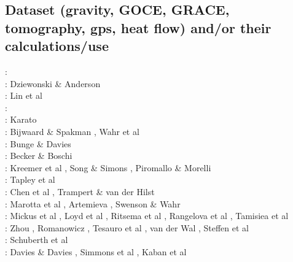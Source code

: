 \subsection{Dataset (gravity, GOCE, GRACE, tomography, gps, heat flow) 
and/or their calculations/use}

\begin{scriptsize}
\nineteenseventyseven: \cite{rola77}\\
\nineteeneightyone: Dziewonski \& Anderson \cite{dzan81}\\
\nineteenninety: Lin et al \cite{lips90}\\
\nineteenninetyone: \cite{spak91}\\
\nineteenninetythree: Karato \cite{kara93}\\
\nineteenninetyeight: Bijwaard \& Spakman \cite{bisp98}, Wahr et al \cite{wamb98}\\
\twothousandone: Bunge \& Davies \cite{buda01}\\
\twothousandtwo: Becker \& Boschi \cite{bebo02}\\
\twothousandthree: Kreemer et al \cite{krhh03}, Song \& Simons \cite{sosi03}, 
Piromallo \& Morelli \cite{pimo03}\\
\twothousandfour: Tapley et al \cite{tabr04}\\
\twothousandfive: Chen et al \cite{chrw05}, Trampert \& van der Hilst \cite{trva05}\\
\twothousandsix: Marotta et al \cite{masr06}, Artemieva \cite{arte06}, Swenson \& Wahr \cite{swwa06}\\
\twothousandseven: Mickus et al \cite{mitk07}, Loyd et al \cite{lobc07}, Ritsema et al \cite{rimb07}, 
Rangelova et al \cite{ravb07}, Tamisiea et al \cite{tamd07}\\
\twothousandeight: Zhou \cite{zhou08}, Romanowicz \cite{roma08}, Tesauro et al \cite{tekc08}, van der Wal \cite{vaws08}, 
Steffen et al \cite{stdm08}\\
\twothousandnine: Schuberth et al \cite{scbr09}\\
\twothousandten: Davies \& Davies \cite{dada10}, Simmons et al \cite{sifb10}, Kaban et al \cite{katc10}\\

\end{scriptsize}
